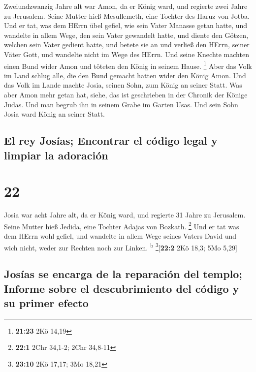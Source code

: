  Zweiundzwanzig Jahre alt war Amon, da er König ward, und
regierte zwei Jahre zu Jerusalem. Seine Mutter hieß Mesullemeth, eine
Tochter des Haruz von Jotba.  Und er tat, was dem HErrn
übel gefiel, wie sein Vater Manasse getan hatte,  und
wandelte in allem Wege, den sein Vater gewandelt hatte, und diente den
Götzen, welchen sein Vater gedient hatte, und betete sie an
 und verließ den HErrn, seiner Väter Gott, und wandelte
nicht im Wege des HErrn.  Und seine Knechte machten einen
Bund wider Amon und töteten den König in seinem Hause. \footnote{\textbf{21:23}
  2Kö 14,19}  Aber das Volk im Land schlug alle, die den
Bund gemacht hatten wider den König Amon. Und das Volk im Lande machte
Josia, seinen Sohn, zum König an seiner Statt.  Was aber
Amon mehr getan hat, siehe, das ist geschrieben in der Chronik der
Könige Judas.  Und man begrub ihn in seinem Grabe im
Garten Usas. Und sein Sohn Josia ward König an seiner Statt.

\hypertarget{el-rey-josuxedas-encontrar-el-cuxf3digo-legal-y-limpiar-la-adoraciuxf3n}{%
\subsection{El rey Josías; Encontrar el código legal y limpiar la
adoración}\label{el-rey-josuxedas-encontrar-el-cuxf3digo-legal-y-limpiar-la-adoraciuxf3n}}

\hypertarget{section-21}{%
\section{22}\label{section-21}}

 Josia war acht Jahre alt, da er König ward, und regierte
31 Jahre zu Jerusalem. Seine Mutter hieß Jedida, eine Tochter Adajas von
Bozkath. \footnote{\textbf{22:1} 2Chr 34,1-2; 2Chr 34,8-11}
 Und er tat was dem HErrn wohl gefiel, und wandelte in
allem Wege seines Vaters David und wich nicht, weder zur Rechten noch
zur Linken. \textsuperscript{b} \footnote{\textbf{23:10} 2Kö 17,17; 3Mo
  18,21}{[}\textbf{22:2} 2Kö 18,3; 5Mo 5,29{]}

\hypertarget{josuxedas-se-encarga-de-la-reparaciuxf3n-del-templo-informe-sobre-el-descubrimiento-del-cuxf3digo-y-su-primer-efecto}{%
\subsection{Josías se encarga de la reparación del templo; Informe sobre
el descubrimiento del código y su primer
efecto}\label{josuxedas-se-encarga-de-la-reparaciuxf3n-del-templo-informe-sobre-el-descubrimiento-del-cuxf3digo-y-su-primer-efecto}}

